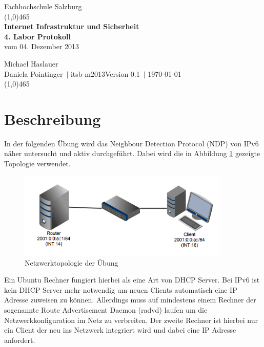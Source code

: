 \documentclass[a4paper,12pt]{article} %
\author{\theauthor\\\company}
\date{\thedate}
\title{\thetitle}
\def \theauthor  {Michael Haslauer\\Daniela Pointinger}
\def \thedate    {\today}
\def \thetitle   {Internet Infrastruktur und Sicherheit\\4. Labor Protokoll}
\def \subtitle   {vom 04. Dezember 2013}
\def \company    {Fachhochschule Salzburg}
\def \department {itsb-m2013}
\def \version    {0.1}
\begin{document}
\begin{titlepage}
\begin{center}
\Large\company\tiny\\
\textcolor{titlepagelinecolor}{\line(1,0){465}\\[1cm]}
\huge
\textbf{\thetitle}\\
\Large \subtitle\\[1cm]
\end{center}
\large
\theauthor\ $\mid$ \department\hfill Version \version\ $\mid$ \thedate\\[1cm]
\textcolor{titlepagelinecolor}{\line(1,0){465}\\[1cm]}
\end{titlepage}

\tableofcontents %

\newpage

\section{Beschreibung}
In der folgenden Übung wird das Neighbour Detection Protocol (NDP) von IPv6 näher untersucht und aktiv durchgeführt. Dabei wird die in Abbildung \ref{fig:topologie} gezeigte Topologie verwendet.

\begin{figure}[ht]
	\centering
		\includegraphics[width=0.90\textwidth]{img/lab04.png}
	\caption{Netzwerktopologie der Übung}
	\label{fig:topologie}
\end{figure}

Ein Ubuntu Rechner fungiert hierbei als eine Art von DHCP Server. Bei IPv6 ist kein DHCP Server mehr notwendig um neuen Clients automatisch eine IP Adresse zuweisen zu können. Allerdings muss auf mindestens einem Rechner der sogenannte Route Advertisement Daemon (radvd) laufen um die Netzwerkkonfiguration im Netz zu verbreiten. Der zweite Rechner ist hierbei nur ein Client der neu ins Netzwerk integriert wird und dabei eine IP Adresse anfordert.
\end{document}
